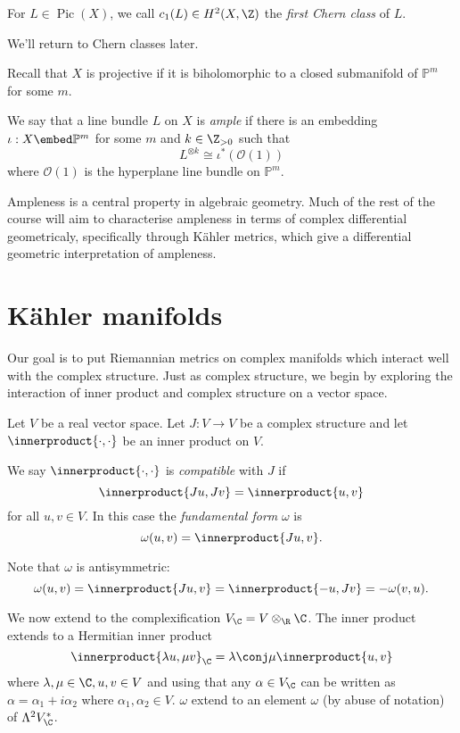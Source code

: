 \documentclass[a4paper]{article}
\renewcommand{\P}{\mathbb P} %
\DeclareMathOperator{\Pic}{Pic} %
\newcommand*{\ip}{\innerproduct}
\begin{document}
\begin{definition}
  For \(L \in \Pic(X)\), we call \(c_1(L) \in H^2(X, \Z)\) the \emph{first Chern class} of \(L\).
\end{definition}
We'll return to Chern classes later.

Recall that \(X\) is projective if it is biholomorphic to a closed submanifold of \(\P^m\) for some \(m\).

\begin{definition}
  We say that a line bundle \(L\) on \(X\) is \emph{ample} if there is an embedding \(\iota: X \embed \P^m\) for some \(m\) and \(k \in \Z_{> 0}\) such that
  \[
    L^{\otimes k} \cong \iota^*(\mathcal O(1))
  \]
  where \(\mathcal O(1)\) is the hyperplane line bundle on \(\P^m\).
\end{definition}

Ampleness is a central property in algebraic geometry. Much of the rest of the course will aim to characterise ampleness in terms of complex differential geometricaly, specifically through Kähler metrics, which give a differential geometric interpretation of ampleness.

\section{Kähler manifolds}

Our goal is to put Riemannian metrics on complex manifolds which interact well with the complex structure. Just as complex structure, we begin by exploring the interaction of inner product and complex structure on a vector space.

Let \(V\) be a real vector space. Let \(J: V \to V\) be a complex structure and let \(\ip{\cdot, \cdot}\) be an inner product on \(V\).

\begin{definition}
  We say \(\ip{\cdot, \cdot}\) is  \emph{compatible} with \(J\) if
  \[
    \ip{Ju, Jv} = \ip{u, v}
  \]
  for all \(u, v \in V\). In this case the \emph{fundamental form} \(\omega\) is
  \[
    \omega(u, v) = \ip{Ju, v}.
  \]
\end{definition}
Note that \(\omega\) is antisymmetric:
\[
  \omega(u, v) = \ip{Ju, v} = \ip{-u, Jv} = - \omega(v, u).
\]

We now extend to the complexification \(V_\C = V \otimes_\R \C\). The inner product extends to a Hermitian inner product
\[
  \ip{\lambda u, \mu v}_\C = \lambda \conj \mu \ip{u, v}
\]
where \(\lambda, \mu \in \C, u, v \in V\) and using that any \(\alpha \in V_\C\) can be written as \(\alpha = \alpha_1 + i\alpha_2\) where \(\alpha_1, \alpha_2 \in V\). \(\omega\) extend to an element \(\omega\) (by abuse of notation) of \(\Lambda^2V_\C^*\).
\end{document}

